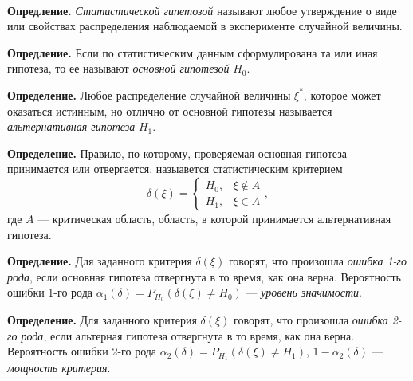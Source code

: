 \documentclass[9pt]{article}
\begin{document}
\ 
\par\textbf{Опредление.} \textit{Статистической гипетозой} называют любое утверждение о виде или свойствах распределения наблюдаемой в эксперименте случайной величины.
\par\textbf{Опредление.} Если по статистическим данным сформулирована та или иная гипотеза, то ее называют \textit{основной гипотезой} \(H_0\).
\par\textbf{Определение.} Любое распределение случайной величины \(\xi^*\), которое может оказаться истинным, но отлично от основной гипотезы называется \textit{альтернативная гипотеза} \(H_1\).
\par\textbf{Определение.} Правило, по которому, проверяемая основная гипотеза принимается или отвергается, назыавется статистическим критерием
\[\delta(\xi)=\left\{
\begin{array}{ll}
    H_0, & \xi\notin A \\
    H_1, & \xi\in A
\end{array}\right.,\]
где \(A\) --- критическая область, область, в которой принимается альтернативная гипотеза.
\par\textbf{Опредление.} Для заданного критерия \(\delta(\xi)\) говорят, что произошла \textit{ошибка 1-го рода}, если основная гипотеза отвергнута в то время, как она верна. Вероятность ошибки 1-го рода \(\alpha_1(\delta)=P_{H_0}(\delta(\xi)\neq H_0)\) --- \textit{уровень значимости}.
\par\textbf{Определение.} Для заданного критерия \(\delta(\xi)\) говорят, что произошла \textit{ошибка 2-го рода}, если альтерная гипотеза отвергнута в то время, как она верна. Вероятность ошибки 2-го рода \(\alpha_2(\delta)=P_{H_1}(\delta(\xi)\neq H_1)\), \(1-\alpha_2(\delta)\) --- \textit{мощность критерия}.
\begin{center}
\quad
{}
\end{center}
\end{document}
